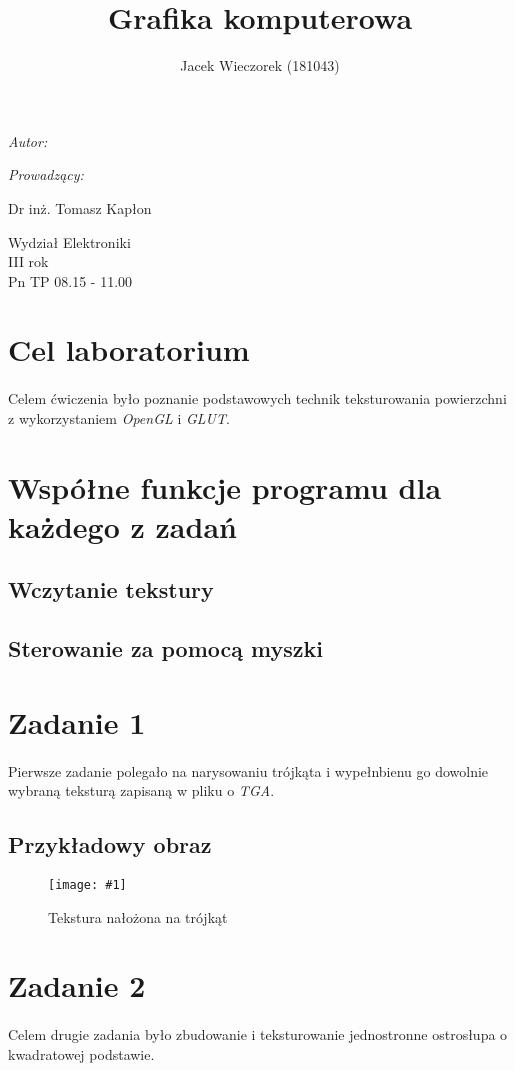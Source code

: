 \documentclass[wide,a4paper,titlepage,12pt] {article}
\title{Grafika komputerowa}
\author{Jacek Wieczorek (181043)}
\makeatletter
\renewcommand{\maketitle}{
\begin{titlepage}
  \begin{center}
    \vspace*{3cm}
    \LARGE \@title \par
    \vspace{2cm}
    \textit{\small Autor:}\par
    \normalsize \@author\par \normalsize
    \vspace{3cm}
    \textit{\small Prowadzący:}\par
    Dr inż. Tomasz Kapłon \par
    \vspace{2cm}
    Wydział Elektroniki\\ III rok\\ Pn TP 08.15 - 11.00\par
    \vspace{4cm}
    \small \@date
  \end{center}
\end{titlepage}
}
\newcommand{\putcode}[2] {
 \lstset{ 
    language=#2,                %
    basicstyle=\scriptsize,       %
    numbers=left,                   %
    numberstyle=\scriptsize,      %
    stepnumber=10,                   %
    numbersep=9pt,                  %
    showspaces=false,               %
    showstringspaces=false,         %
    showtabs=false,                 %
    }
    
}
\newcommand{\putpicture}[4] {
    \begin{figure}[htbp]
        \begin{center}
            \texttt{[image: \#1]}
            \caption{#2}
            \label{#4}
        \end{center}
    \end{figure}
}
\makeatother
\begin{document}
\maketitle

\section{Cel laboratorium}
\paragraph{}
Celem ćwiczenia było poznanie podstawowych technik teksturowania powierzchni z wykorzystaniem \textit{OpenGL} i \textit{GLUT}.

\section{Współne funkcje programu dla każdego z zadań}
\subsection{Wczytanie tekstury}
\putcode{code/dupa.cpp}{c++}
\subsection{Sterowanie za pomocą myszki}

\section{Zadanie 1}
\paragraph{} 
Pierwsze zadanie polegało na narysowaniu trójkąta i wypełnbienu go dowolnie wybraną teksturą zapisaną w pliku o \textit{TGA}.
\subsection{Przykładowy obraz}
\putpicture{img/img1.PNG}{Tekstura nałożona na trójkąt}{\textwidth}{}

\section{Zadanie 2}
\paragraph{} %
Celem drugie zadania było zbudowanie i teksturowanie jednostronne ostrosłupa o kwadratowej podstawie.
\end{document}
